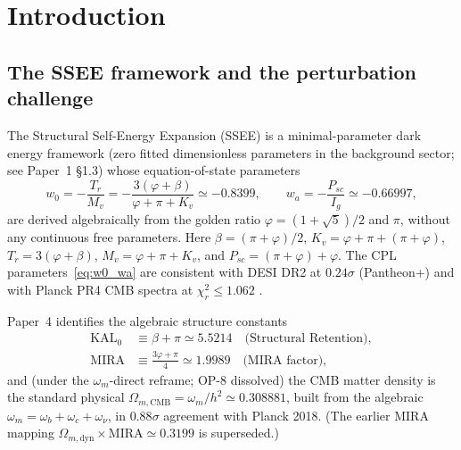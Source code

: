 \documentclass[12pt,a4paper]{article}
\newcommand{\KALz}{\mathrm{KAL}_0}
\begin{document}
\clearpage
{\small\tableofcontents}
\clearpage

\section{Introduction}
\label{sec:intro}

\subsection{The SSEE framework and the perturbation challenge}
\label{subsec:intro_ssee}

The Structural Self-Energy Expansion (SSEE) \citep{SSEE_Paper1} is a
minimal-parameter dark energy framework (zero fitted dimensionless parameters
in the background sector; see Paper~1 \S1.3) whose equation-of-state parameters
\begin{equation}
  w_0 = -\frac{T_r}{M_v}
  = -\frac{3(\varphi+\beta)}{\varphi+\pi+K_v}
  \simeq -0.8399, \qquad
  w_a = -\frac{P_{sc}}{I_g} \simeq -0.66997,
  \label{eq:w0_wa}
\end{equation}
are derived algebraically from the golden ratio $\varphi=(1+\sqrt{5})/2$ and $\pi$,
without any continuous free parameters.
Here $\beta=(\pi+\varphi)/2$, $K_v=\varphi+\pi+(\pi+\varphi)$,
$T_r=3(\varphi+\beta)$, $M_v=\varphi+\pi+K_v$, and $P_{sc}=(\pi+\varphi)+\varphi$.
The CPL parameters~\eqref{eq:w0_wa} \citep{ChevallierPolarski2001,Linder2003} are consistent with DESI DR2 at $0.24\sigma$ (Pantheon+)
\citep{SSEE_Paper2,AbdulKarim2025} and with Planck PR4 CMB spectra at
$\chi^2_r \leq 1.062$ \citep{SSEE_Paper3}.

Paper~4 \citep{SSEE_Paper4} identifies the algebraic structure constants
\begin{align}
  \KALz &\equiv \beta + \pi \simeq 5.5214
  \quad\text{(Structural Retention)}, \\
  \mathrm{MIRA} &\equiv \frac{3\varphi+\pi}{4} \simeq 1.9989
  \quad\text{(MIRA factor)},
\end{align}
and (under the $\omega_m$-direct reframe; OP-8 dissolved) the CMB matter
density is the standard physical $\Omega_{m,\mathrm{CMB}} = \omega_m/h^2
\simeq 0.308881$, built from the algebraic
$\omega_m=\omega_b+\omega_c+\omega_\nu$, in $0.88\sigma$ agreement with
Planck 2018. (The earlier MIRA mapping $\Omega_{m,\mathrm{dyn}}\times\mathrm{MIRA}\simeq0.3199$
is superseded.)
\end{document}
